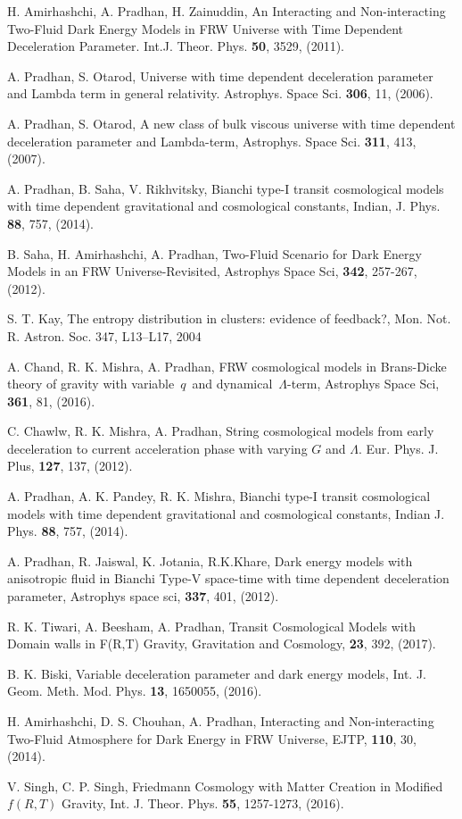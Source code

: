 \documentclass[superscriptaddress,showpacs,pre,twocolumn]{revtex4-1}
\begin{document}
\begin{thebibliography}{99}
 H. Amirhashchi, A. Pradhan, H. Zainuddin, An Interacting and Non-interacting Two-Fluid Dark Energy Models in FRW Universe with Time Dependent Deceleration Parameter. Int.J. Theor. Phys. \textbf{50}, 3529, (2011).

 A. Pradhan, S. Otarod, Universe with time dependent deceleration parameter and Lambda term in general relativity. Astrophys. Space Sci. \textbf{306}, 11, (2006).

 A. Pradhan, S. Otarod, A new class of bulk viscous universe with time dependent deceleration parameter and Lambda-term, Astrophys. Space Sci. \textbf{311}, 413, (2007).


 A. Pradhan, B. Saha, V. Rikhvitsky, Bianchi type-I transit cosmological models with time dependent gravitational and cosmological constants, Indian, J. Phys. \textbf{88}, 757, (2014).

 B. Saha, H. Amirhashchi, A. Pradhan, Two-Fluid Scenario for Dark Energy Models in an FRW Universe-Revisited, Astrophys Space Sci, \textbf{342}, 257-267, (2012). 

 S. T. Kay, The entropy distribution in clusters: evidence of feedback?, Mon. Not. R. Astron. Soc. 347, L13–L17, 2004

 A. Chand, R. K. Mishra, A. Pradhan, FRW cosmological models in Brans-Dicke theory of gravity with variable $q$ and dynamical $\Lambda$-term, Astrophys Space Sci, \textbf{361}, 81, (2016).


 C. Chawlw, R. K. Mishra, A. Pradhan, String cosmological models from early deceleration to current acceleration phase with varying $G$ and $\Lambda$. Eur. Phys. J. Plus, \textbf{127}, 137, (2012).

 A. Pradhan, A. K. Pandey, R. K. Mishra, Bianchi type-I transit cosmological models with time dependent gravitational and cosmological constants, Indian J. Phys. \textbf{88}, 757, (2014).

 A. Pradhan, R. Jaiswal, K. Jotania, R.K.Khare, Dark energy models with anisotropic fluid in Bianchi Type-V space-time with time dependent deceleration parameter, Astrophys space sci, \textbf{337}, 401, (2012).

 R. K. Tiwari, A. Beesham, A. Pradhan, Transit Cosmological Models with Domain walls in F(R,T) Gravity, Gravitation and Cosmology, \textbf{23}, 392, (2017).

 B. K. Biski, Variable deceleration parameter and dark energy models, Int. J. Geom. Meth. Mod. Phys. \textbf{13}, 1650055, (2016).

 H. Amirhashchi, D. S. Chouhan, A. Pradhan, Interacting and Non-interacting Two-Fluid Atmosphere for Dark Energy in FRW Universe, EJTP, \textbf{110}, 30, (2014).


 V. Singh, C. P. Singh, Friedmann Cosmology with Matter Creation in Modified $f(R, T)$ Gravity, Int. J. Theor. Phys. \textbf{55}, 1257-1273, (2016).



\end{thebibliography}
\end{document}
